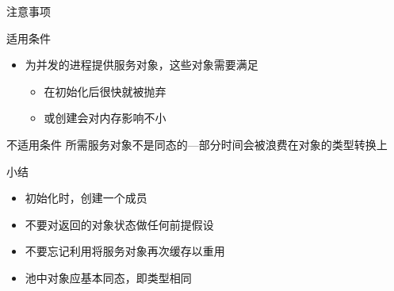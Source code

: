 \begin{frame}{注意事项}
\begin{exampleblock}{适用条件}
    \begin{itemize}
        \item 为并发的进程提供服务对象，这些对象需要满足
            \begin{itemize}
                \item 在初始化后很快就被抛弃
                \item 或创建会对内存影响不小
            \end{itemize}
    \end{itemize}
\end{exampleblock}    

\pause
\begin{alertblock}{不适用条件}
   所需服务对象不是同态的---部分时间会被浪费在对象的类型转换上 
\end{alertblock}
\end{frame}

\begin{frame}{\Pool 小结}
    \begin{itemize}
        \item 初始化\Pool 时，创建一个成员
        \item 不要对返回的对象状态做任何前提假设
        \item 不要忘记利用将服务对象再次缓存以重用
        \item 池中对象应基本同态，即类型相同    
    \end{itemize}
\end{frame}